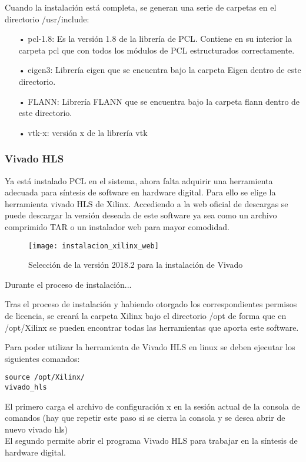 Cuando la instalación está completa, se generan una serie de carpetas en el directorio /usr/include:

\begin{itemize}
\item[•]pcl-1.8: Es la versión 1.8 de la librería de PCL. Contiene en su interior la carpeta pcl que con todos los módulos de PCL estructurados correctamente.
\item[•]eigen3: Librería eigen que se encuentra bajo la carpeta Eigen dentro de este directorio.
\item[•]FLANN: Librería FLANN que se encuentra bajo la carpeta flann dentro de este directorio.
\item[•]vtk-x: versión x de la librería vtk 
\end{itemize}

\subsubsection{Vivado HLS}
Ya está instalado PCL en el sistema, ahora falta adquirir una herramienta adecuada para síntesis de software en hardware digital. Para ello se elige la herramienta vivado HLS de Xilinx. Accediendo a la web oficial de descargas se puede descargar la versión deseada de este software ya sea como un archivo comprimido TAR o un instalador web para mayor comodidad.

\begin{figure}[!htb]
\centering
{}
  \texttt{[image: instalacion\_xilinx\_web]}
  \caption{Selección de la versión 2018.2 para la instalación de Vivado}\label{fig:instalacion_xilinx_web}
\endminipage\hfill
\end{figure}

Durante el proceso de instalación...


Tras el proceso de instalación y habiendo otorgado los correspondientes permisos de licencia, se creará la carpeta Xilinx bajo el directorio /opt de forma que en /opt/Xilinx se pueden encontrar todas las herramientas que aporta este software.

Para poder utilizar la herramienta de Vivado HLS en linux se deben ejecutar los siguientes comandos:

\begin{verbatim}
source /opt/Xilinx/
vivado_hls
\end{verbatim}
El primero carga el archivo de configuración x en la sesión actual de la consola de comandos (hay que repetir este paso si se cierra la consola y se desea abrir de nuevo vivado hls)
\\
El segundo permite abrir el programa Vivado HLS para trabajar en la síntesis de hardware digital.



